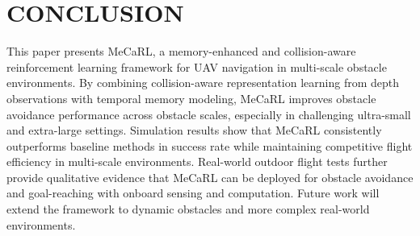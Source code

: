 \documentclass[letterpaper, 10 pt, conference]{ieeeconf}  %
\begin{document}
\section{CONCLUSION}
This paper presents MeCaRL, a memory-enhanced and collision-aware reinforcement learning framework for UAV navigation in multi-scale obstacle environments. 
By combining collision-aware representation learning from depth observations with temporal memory modeling, MeCaRL improves obstacle avoidance performance across obstacle scales, 
especially in challenging ultra-small and extra-large settings. Simulation results show that MeCaRL consistently outperforms baseline methods in success rate while maintaining competitive flight efficiency in multi-scale environments. 
Real-world outdoor flight tests further provide qualitative evidence that MeCaRL can be deployed for obstacle avoidance and goal-reaching with onboard sensing and computation. 
Future work will extend the framework to dynamic obstacles and more complex real-world environments.



\balance




\end{document}

